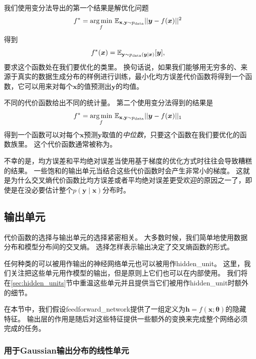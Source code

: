
我们使用变分法导出的第一个结果是解优化问题
\begin{equation}
f^* = \underset{f}{\arg\min}  \ \mathbb{E}_{\mathbf{x}, \mathbf{y} \sim  p_\text{data}} ||\bm{y}-f(\bm{x})||^2
\end{equation}
得到
\begin{equation}
f^*(\bm{x}) = \mathbb{E}_{\mathbf{y}\sim p_\text{data}(\bm{y}|\bm{x})} [\bm{y}],
\end{equation}
要求这个函数处在我们要优化的类里。
换句话说，如果我们能够用无穷多的、来源于真实的数据生成分布的样例进行训练，最小化均方误差代价函数将得到一个函数，它可以用来对每个$\bm{x}$的值预测出$\bm{y}$的均值。

不同的代价函数给出不同的统计量。
第二个使用变分法得到的结果是
\begin{equation}
f^* = \underset{f}{\arg\min} \ \mathbb{E}_{\mathbf{x}, \mathbf{y} \sim  p_\text{data}} ||\bm{y} - f(\bm{x})||_1
\end{equation}
得到一个函数可以对每个$\bm{x}$预测$\bm{y}$取值的\emph{中位数}，只要这个函数在我们要优化的函数族里。
这个代价函数通常被称为。

不幸的是，均方误差和平均绝对误差当使用基于梯度的优化方式时往往会导致糟糕的结果。
一些饱和的输出单元当结合这些代价函数时会产生非常小的梯度。
这就是为什么交叉熵代价函数比均方误差或者平均绝对误差更受欢迎的原因之一了，即使是在没必要估计整个$p(\bm{y}\mid\bm{x})$分布时。


\subsection{输出单元}
\label{sec:output_units}

代价函数的选择与输出单元的选择紧密相关。
大多数时候，我们简单地使用数据分布和模型分布间的交叉熵。
选择怎样表示输出决定了交叉熵函数的形式。

任何种类的可以被用作输出的神经网络单元也可以被用作\gls{hidden_unit}。
这里，我们关注把这些单元用作模型的输出，但是原则上它们也可以在内部使用。
我们将在\ref{sec:hidden_units}节中重温这些单元并且提供当它们被用作\gls{hidden_unit}时额外的细节。

在本节中，我们假设\gls{feedforward_network}提供了一组定义为$\bm{h}=f(\bm{x};\bm{\theta})$的隐藏特征。
输出层的作用是随后对这些特征提供一些额外的变换来完成整个网络必须完成的任务。


\subsubsection{用于Gaussian输出分布的线性单元}
\label{sec:linear_units_for_gaussian_output_distributions}

